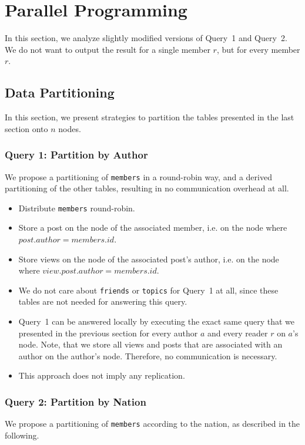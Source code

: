 \documentclass[12pt]{article}
\begin{document}
\section{Parallel Programming}
In this section, we analyze slightly modified versions of Query~1 and Query~2. We do not want to output the result for a single member $r$, but for every member $r$.

\subsection{Data Partitioning}
In this section, we present strategies to partition the tables presented in the last section onto $n$ nodes.

\subsubsection{Query 1: Partition by Author}
We propose a partitioning of \lstinline{members} in a round-robin way, and a derived partitioning of the other tables, resulting in no communication overhead at all.

\begin{itemize}
	\item Distribute \lstinline{members} round-robin.
    \item Store a post on the node of the associated member, i.e. on the node where $\mathit{post.author} = \mathit{members.id}$.
    \item Store views on the node of the associated post's author, i.e. on the node where $\mathit{view.post.author} = \mathit{members.id}$.
    \item We do not care about \lstinline{friends} or 
    \lstinline{topics} for Query~1 at all, since these tables are not needed for answering this query.
    \item Query~1 can be answered locally by executing the exact same query that we presented in the previous section for every author $a$ and every reader $r$ on $a$'s node. Note, that we store all views and posts that are associated with an author on the author's node. Therefore, no communication is necessary.
    \item This approach does not imply any replication.
\end{itemize}

\subsubsection{Query 2: Partition by Nation}
We propose a partitioning of \lstinline{members} according to the nation, as described in the following.
\end{document}
